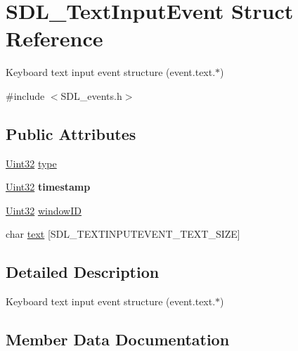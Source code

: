 \hypertarget{struct_s_d_l___text_input_event}{}\section{S\+D\+L\+\_\+\+Text\+Input\+Event Struct Reference}
\label{struct_s_d_l___text_input_event}


Keyboard text input event structure (event.\+text.$\ast$)  




{\ttfamily \#include $<$S\+D\+L\+\_\+events.\+h$>$}

\subsection*{Public Attributes}
\begin{DoxyCompactItemize}
\item 
\hyperlink{_s_d_l__stdinc_8h_add440eff171ea5f55cb00c4a9ab8672d}{Uint32} \hyperlink{struct_s_d_l___text_input_event_a90576be2ea52e694deff40d0586654f5}{type}
\item 
\mbox{\label{struct_s_d_l___text_input_event_a20b190a96494918690ea7f99187be948}} 
\hyperlink{_s_d_l__stdinc_8h_add440eff171ea5f55cb00c4a9ab8672d}{Uint32} {\bfseries timestamp}
\item 
\hyperlink{_s_d_l__stdinc_8h_add440eff171ea5f55cb00c4a9ab8672d}{Uint32} \hyperlink{struct_s_d_l___text_input_event_aeb4f7a939353990ca40261ffbfbeb3d0}{window\+ID}
\item 
char \hyperlink{struct_s_d_l___text_input_event_a1a95531f466dff01c2f108f53ff24554}{text} \mbox{[}S\+D\+L\+\_\+\+T\+E\+X\+T\+I\+N\+P\+U\+T\+E\+V\+E\+N\+T\+\_\+\+T\+E\+X\+T\+\_\+\+S\+I\+ZE\mbox{]}
\end{DoxyCompactItemize}


\subsection{Detailed Description}
Keyboard text input event structure (event.\+text.$\ast$) 

\subsection{Member Data Documentation}
\mbox{\label{struct_s_d_l___text_input_event_a1a95531f466dff01c2f108f53ff24554}} 
